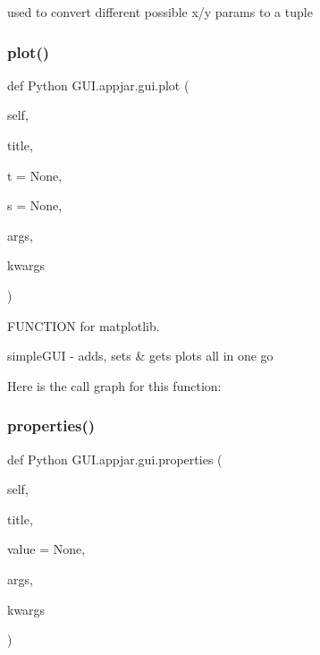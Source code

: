 \begin{DoxyVerb}
\begin{DoxyVerb}used to convert different possible x/y params to a tuple
\end{DoxyVerb}
 \mbox{\label{class_python_01_g_u_i_1_1appjar_1_1gui_a13326043fc52bc57c5026d450df555d3}} 
\subsubsection{\texorpdfstring{plot()}{plot()}}
{\footnotesize\ttfamily def Python G\+U\+I.\+appjar.\+gui.\+plot (\begin{DoxyParamCaption}\item[{}]{self,  }\item[{}]{title,  }\item[{}]{t = {\ttfamily None},  }\item[{}]{s = {\ttfamily None},  }\item[{}]{args,  }\item[{}]{kwargs }\end{DoxyParamCaption})}



F\+U\+N\+C\+T\+I\+ON for matplotlib. 

\begin{DoxyVerb}simpleGUI - adds, sets & gets plots all in one go \end{DoxyVerb}
 Here is the call graph for this function\+:
\mbox{\label{class_python_01_g_u_i_1_1appjar_1_1gui_a50c26e267852e3af712d6040d7963431}} 
\subsubsection{\texorpdfstring{properties()}{properties()}}
{\footnotesize\ttfamily def Python G\+U\+I.\+appjar.\+gui.\+properties (\begin{DoxyParamCaption}\item[{}]{self,  }\item[{}]{title,  }\item[{}]{value = {\ttfamily None},  }\item[{}]{args,  }\item[{}]{kwargs }\end{DoxyParamCaption})}




\end{DoxyVerb}
